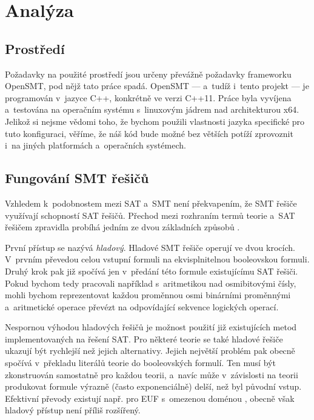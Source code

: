 \chapter{Analýza}

\section{Prostředí}

Požadavky na použité prostředí jsou určeny převážně požadavky frameworku OpenSMT, pod nějž tato práce spadá. OpenSMT --- a~tudíž i~tento projekt --- je programován v~jazyce C++, konkrétně ve verzi C++11. Práce byla vyvíjena a~testována na operačním systému s~linuxovým jádrem nad architekturou x64. Jelikož si nejsme vědomi toho, že bychom použili vlastnosti jazyka specifické pro tuto konfiguraci, věříme, že náš kód bude možné bez větších potíží zprovoznit i~na jiných platformách a~operačních systémech.

\section{Fungování SMT řešičů}\label{smt}

Vzhledem k~podobnostem mezi SAT a~SMT není překvapením, že SMT řešiče využívají schopností SAT řešičů. Přechod mezi rozhraním termů teorie a~SAT řešičem zpravidla probíhá jedním ze dvou základních způsobů \cite{Nieuwenhuis05}.

První přístup se nazývá \emph{hladový}. Hladové SMT řešiče operují ve dvou krocích. V~prvním převedou celou vstupní formuli na ekvisplnitelnou booleovskou formuli. Druhý krok pak již spočívá jen v~předání této formule existujícímu SAT řešiči. Pokud bychom tedy pracovali například s~aritmetikou nad osmibitovými čísly, mohli bychom reprezentovat každou proměnnou osmi binárními proměnnými a~aritmetické operace převézt na odpovídající sekvence logických operací.

Nespornou výhodou hladových řešičů je možnost použití již existujících metod implementovaných na řešení SAT. Pro některé teorie se také hladové řešiče ukazují být rychlejší než jejich alternativy. Jejich největší problém pak obecně spočívá v~překladu literálů teorie do booleovských formulí. Ten musí být zkonstruován samostatně pro každou teorii, a~navíc může v~závislosti na teorii produkovat formule výrazně (často exponenciálně) delší, než byl původní vstup. Efektivní převody existují např. pro EUF s~omezenou doménou \cite{randal02}, obecně však hladový přístup není příliš rozšířený.


